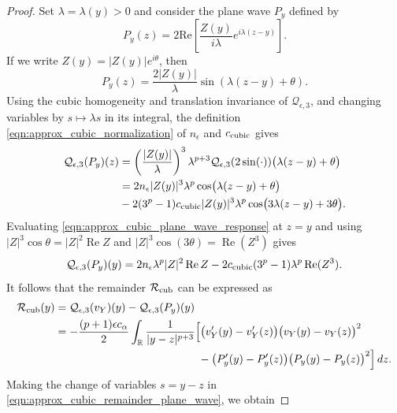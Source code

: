 \documentclass[11pt]{amsart}
\theoremstyle{definition}
\theoremstyle{remark}
\numberwithin{equation}{section}
\newcommand{\R}{\mathbb{R}}
\newcommand{\mc}[1]{\mathcal{#1}}
\begin{document}
\begin{proof}
    Set $\lambda=\lambda(y)>0$ and consider the plane wave $P_y$ defined by
    \[P_y(z) = 2\text{Re}\left[\frac{Z(y)}{i\lambda}e^{i\lambda(z - y)}\right].\]
    If we write $Z(y) = |Z(y)|e^{i\theta}$, then 
    \[P_y(z) = \frac{2|Z(y)|}{\lambda}\sin\left(\lambda(z-y) + \theta\right).\]
    Using the cubic homogeneity and translation invariance of $\mc{Q}_{\epsilon,3}$, and changing variables by $s\mapsto\lambda s$ in its integral, the definition \eqref{eqn:approx_cubic_normalization} of $n_\epsilon$ and $c_{\textup{cubic}}$ gives
    \begin{align}
        \mc{Q}_{\epsilon,3}(P_y)(z)
        &=\left(\frac{|Z(y)|}{\lambda}\right)^3\lambda^{p+3}
        \mc{Q}_{\epsilon,3}(2\sin(\cdot))\bigl(\lambda(z-y)+\theta\bigr)\notag\\
        &=2n_\epsilon|Z(y)|^3\lambda^p\cos\bigl(\lambda(z-y)+\theta\bigr)\notag\\
        &-2(3^p-1)c_{\textup{cubic}}|Z(y)|^3\lambda^p\cos\bigl(3\lambda(z-y)+3\theta\bigr).
        \label{eqn:approx_cubic_plane_wave_response}
    \end{align}
    Evaluating \eqref{eqn:approx_cubic_plane_wave_response} at $z=y$ and using $|Z|^3\cos\theta=|Z|^2\operatorname{Re}Z$ and $|Z|^3\cos(3\theta)=\operatorname{Re}(Z^3)$ gives
    \begin{equation}\label{eqn:approx_cubic_plane_wave_frozen}
        \mc{Q}_{\epsilon,3}(P_y)(y)
        =2n_\epsilon\lambda^p|Z|^2\operatorname{Re}Z
        -2c_{\textup{cubic}}(3^p-1)\lambda^p\operatorname{Re}(Z^3).
    \end{equation}
    It follows that the remainder $\mc{R}_{\textup{cub}}$ can be expressed as
    \begin{equation}\label{eqn:approx_cubic_remainder_plane_wave}
        \begin{aligned}
            \mc{R}_{\textup{cub}}(y)
            &=\mc{Q}_{\epsilon,3}(v_Y)(y)-\mc{Q}_{\epsilon,3}(P_y)(y)\\
            &=-\frac{(p+1)\epsilon c_\alpha}{2}\int_{\R}\frac{1}{|y-z|^{p+3}}\Big[
            \bigl(v_Y'(y)-v_Y'(z)\bigr)\bigl(v_Y(y)-v_Y(z)\bigr)^2\\
            &\hspace{130pt}-\bigl(P_y'(y)-P_y'(z)\bigr)\bigl(P_y(y)-P_y(z)\bigr)^2\Big]\,dz.
        \end{aligned}
    \end{equation}
    Making the change of variables $s=y-z$ in \eqref{eqn:approx_cubic_remainder_plane_wave}, we obtain

\end{proof}
\end{document}
